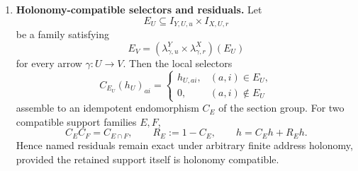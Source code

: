 \begin{theorem}
\begin{enumerate}[label=\textup{(H\arabic*)}]
\item \textbf{Holonomy-compatible selectors and residuals.}
Let
\[
 E_U\subseteq I_{Y,U,u}\times I_{X,U,r}
\]
be a family satisfying
\[
 E_V=
 (\lambda^Y_{\gamma,u}\times\lambda^X_{\gamma,r})(E_U)
\]
for every arrow \(\gamma:U\to V\).  Then the local selectors
\[
 C_{E_U}(h_U)_{ai}
 =
 \begin{cases}
 h_{U,ai},&(a,i)\in E_U,\\
 0,&(a,i)\notin E_U
 \end{cases}
\]
assemble to an idempotent endomorphism \(C_E\) of the section group.  For two
compatible support families \(E,F\),
\[
 C_EC_F=C_{E\cap F},
 \qquad
 R_E:=1-C_E,
 \qquad
 h=C_Eh+R_Eh.
\]
Hence named residuals remain exact under arbitrary finite address holonomy,
provided the retained support itself is holonomy compatible.
\end{enumerate}
\end{theorem}

